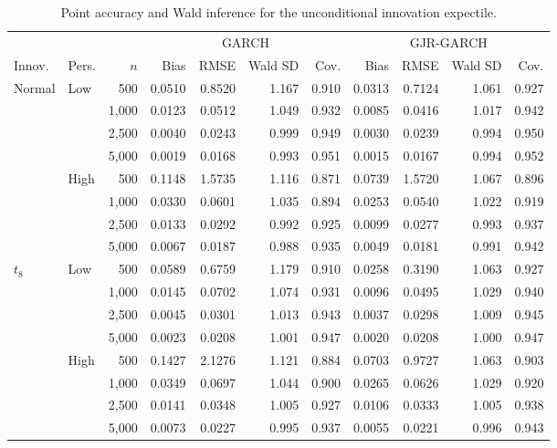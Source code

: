 \begin{table}[!p]
\centering
\caption{Point accuracy and Wald inference for the unconditional innovation expectile.}
\label{tab:mc-xi-wald-portrait}
\footnotesize
\setlength{\tabcolsep}{3.0pt}
\renewcommand{\arraystretch}{1.02}
\begin{tabular}{llr*{8}{r}}
\toprule
&&&\multicolumn{4}{c}{GARCH}&\multicolumn{4}{c}{GJR-GARCH}\\
\cmidrule(lr){4-7}\cmidrule(lr){8-11}
Innov. & Pers. & $n$ & Bias & RMSE & Wald SD & Cov. & Bias & RMSE & Wald SD & Cov.\\
\midrule
Normal & Low & 500 & 0.0510 & 0.8520 & 1.167 & 0.910 & 0.0313 & 0.7124 & 1.061 & 0.927\\
 &  & 1,000 & 0.0123 & 0.0512 & 1.049 & 0.932 & 0.0085 & 0.0416 & 1.017 & 0.942\\
 &  & 2,500 & 0.0040 & 0.0243 & 0.999 & 0.949 & 0.0030 & 0.0239 & 0.994 & 0.950\\
 &  & 5,000 & 0.0019 & 0.0168 & 0.993 & 0.951 & 0.0015 & 0.0167 & 0.994 & 0.952\\
\addlinespace[1pt]
 & High & 500 & 0.1148 & 1.5735 & 1.116 & 0.871 & 0.0739 & 1.5720 & 1.067 & 0.896\\
 &  & 1,000 & 0.0330 & 0.0601 & 1.035 & 0.894 & 0.0253 & 0.0540 & 1.022 & 0.919\\
 &  & 2,500 & 0.0133 & 0.0292 & 0.992 & 0.925 & 0.0099 & 0.0277 & 0.993 & 0.937\\
 &  & 5,000 & 0.0067 & 0.0187 & 0.988 & 0.935 & 0.0049 & 0.0181 & 0.991 & 0.942\\
\addlinespace[3pt]
$t_8$ & Low & 500 & 0.0589 & 0.6759 & 1.179 & 0.910 & 0.0258 & 0.3190 & 1.063 & 0.927\\
 &  & 1,000 & 0.0145 & 0.0702 & 1.074 & 0.931 & 0.0096 & 0.0495 & 1.029 & 0.940\\
 &  & 2,500 & 0.0045 & 0.0301 & 1.013 & 0.943 & 0.0037 & 0.0298 & 1.009 & 0.945\\
 &  & 5,000 & 0.0023 & 0.0208 & 1.001 & 0.947 & 0.0020 & 0.0208 & 1.000 & 0.947\\
\addlinespace[1pt]
 & High & 500 & 0.1427 & 2.1276 & 1.121 & 0.884 & 0.0703 & 0.9727 & 1.063 & 0.903\\
 &  & 1,000 & 0.0349 & 0.0697 & 1.044 & 0.900 & 0.0265 & 0.0626 & 1.029 & 0.920\\
 &  & 2,500 & 0.0141 & 0.0348 & 1.005 & 0.927 & 0.0106 & 0.0333 & 1.005 & 0.938\\
 &  & 5,000 & 0.0073 & 0.0227 & 0.995 & 0.937 & 0.0055 & 0.0221 & 0.996 & 0.943\\

\end{tabular}
\end{table}
